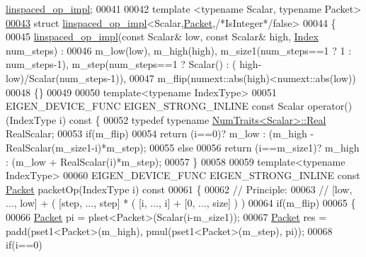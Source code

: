 \begin{DoxyCode}
      \hyperlink{struct_eigen_1_1internal_1_1linspaced__op__impl}{linspaced\_op\_impl};
00041 
00042 \textcolor{keyword}{template} <\textcolor{keyword}{typename} Scalar, \textcolor{keyword}{typename} Packet>
\hyperlink{struct_eigen_1_1internal_1_1linspaced__op__impl_3_01_scalar_00_01_packet_00_01false_01_4}{00043} \textcolor{keyword}{struct }\hyperlink{struct_eigen_1_1internal_1_1linspaced__op__impl}{linspaced\_op\_impl}<Scalar,\hyperlink{union_eigen_1_1internal_1_1_packet}{Packet},\textcolor{comment}{/*IsInteger*/}false>
00044 \{
00045   \hyperlink{struct_eigen_1_1internal_1_1linspaced__op__impl}{linspaced\_op\_impl}(\textcolor{keyword}{const} Scalar& low, \textcolor{keyword}{const} Scalar& high, 
      \hyperlink{namespace_eigen_a62e77e0933482dafde8fe197d9a2cfde}{Index} num\_steps) :
00046     m\_low(low), m\_high(high), m\_size1(num\_steps==1 ? 1 : num\_steps-1), m\_step(num\_steps==1 ? Scalar() : (
      high-low)/Scalar(num\_steps-1)),
00047     m\_flip(numext::abs(high)<numext::abs(low))
00048   \{\}
00049 
00050   \textcolor{keyword}{template}<\textcolor{keyword}{typename} IndexType>
00051   EIGEN\_DEVICE\_FUNC EIGEN\_STRONG\_INLINE \textcolor{keyword}{const} Scalar operator() (IndexType i)\textcolor{keyword}{ const }\{
00052     \textcolor{keyword}{typedef} \textcolor{keyword}{typename} \hyperlink{group___core___module_struct_eigen_1_1_num_traits}{NumTraits<Scalar>::Real} RealScalar;
00053     \textcolor{keywordflow}{if}(m\_flip)
00054       \textcolor{keywordflow}{return} (i==0)? m\_low : (m\_high - RealScalar(m\_size1-i)*m\_step);
00055     \textcolor{keywordflow}{else}
00056       \textcolor{keywordflow}{return} (i==m\_size1)? m\_high : (m\_low + RealScalar(i)*m\_step);
00057   \}
00058 
00059   \textcolor{keyword}{template}<\textcolor{keyword}{typename} IndexType>
00060   EIGEN\_DEVICE\_FUNC EIGEN\_STRONG\_INLINE \textcolor{keyword}{const} \hyperlink{union_eigen_1_1internal_1_1_packet}{Packet} packetOp(IndexType i)\textcolor{keyword}{ const}
00061 \textcolor{keyword}{  }\{
00062     \textcolor{comment}{// Principle:}
00063     \textcolor{comment}{// [low, ..., low] + ( [step, ..., step] * ( [i, ..., i] + [0, ..., size] ) )}
00064     \textcolor{keywordflow}{if}(m\_flip)
00065     \{
00066       \hyperlink{union_eigen_1_1internal_1_1_packet}{Packet} pi = plset<Packet>(Scalar(i-m\_size1));
00067       \hyperlink{union_eigen_1_1internal_1_1_packet}{Packet} res = padd(pset1<Packet>(m\_high), pmul(pset1<Packet>(m\_step), pi));
00068       \textcolor{keywordflow}{if}(i==0)

\end{DoxyCode}
